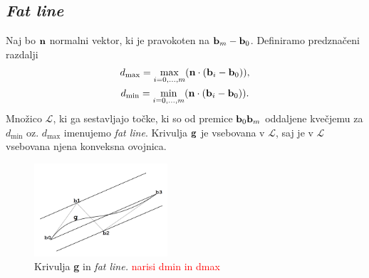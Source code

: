 
\subsection{{\em Fat line}}
Naj bo ${\bf n}$ normalni vektor, ki je pravokoten na ${\bf b}_m - {\bf b}_0$. Definiramo predznačeni razdalji 
\begin{gather*}
d_{\text{max}} = \max _{i=0,\ldots ,m} ({\bf n}\cdot ({\bf b}_i - {\bf b}_0)),\\
d_{\text{min}} = \min _{i=0,\ldots ,m} ({\bf n}\cdot ({\bf b}_i - {\bf b}_0)).
\end{gather*}
Množico $\mathcal{L}$, ki ga sestavljajo točke, ki so od premice ${\bf b}_0{\bf b}_m$ oddaljene kvečjemu za $d_{\text{min}}$ oz. $d_{\text{max}}$ imenujemo {\em fat line}. Krivulja ${\bf g}$ je vsebovana v $\mathcal{L}$, saj je v $\mathcal{L}$ vsebovana njena konveksna ovojnica.
\begin{figure}[!h]
    \centering 
    \includegraphics[width=0.44\textwidth]{fat_line}
    \caption{Krivulja {\bf g} in {\em fat line.} \textcolor{red}{narisi dmin in dmax}}
  	\label{slika3}
\end{figure}